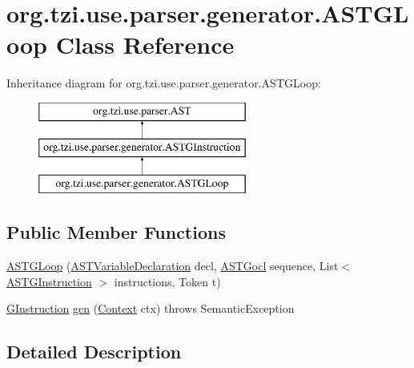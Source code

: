 \hypertarget{classorg_1_1tzi_1_1use_1_1parser_1_1generator_1_1_a_s_t_g_loop}{\section{org.\-tzi.\-use.\-parser.\-generator.\-A\-S\-T\-G\-Loop Class Reference}
\label{classorg_1_1tzi_1_1use_1_1parser_1_1generator_1_1_a_s_t_g_loop}
}
Inheritance diagram for org.\-tzi.\-use.\-parser.\-generator.\-A\-S\-T\-G\-Loop\-:\begin{figure}[H]
\begin{center}
\leavevmode
\includegraphics[height=3.000000cm]{classorg_1_1tzi_1_1use_1_1parser_1_1generator_1_1_a_s_t_g_loop}
\end{center}
\end{figure}
\subsection*{Public Member Functions}
\begin{DoxyCompactItemize}
\item 
\hyperlink{classorg_1_1tzi_1_1use_1_1parser_1_1generator_1_1_a_s_t_g_loop_a2db75a80cf196518b4ae851c346c1de1}{A\-S\-T\-G\-Loop} (\hyperlink{classorg_1_1tzi_1_1use_1_1parser_1_1ocl_1_1_a_s_t_variable_declaration}{A\-S\-T\-Variable\-Declaration} decl, \hyperlink{classorg_1_1tzi_1_1use_1_1parser_1_1generator_1_1_a_s_t_gocl}{A\-S\-T\-Gocl} sequence, List$<$ \hyperlink{classorg_1_1tzi_1_1use_1_1parser_1_1generator_1_1_a_s_t_g_instruction}{A\-S\-T\-G\-Instruction} $>$ instructions, Token t)
\item 
\hyperlink{interfaceorg_1_1tzi_1_1use_1_1gen_1_1assl_1_1statics_1_1_g_instruction}{G\-Instruction} \hyperlink{classorg_1_1tzi_1_1use_1_1parser_1_1generator_1_1_a_s_t_g_loop_a2d3a653ffd9fa6847a2ac38c13f0c538}{gen} (\hyperlink{classorg_1_1tzi_1_1use_1_1parser_1_1_context}{Context} ctx)  throws Semantic\-Exception 
\end{DoxyCompactItemize}


\subsection{Detailed Description}


